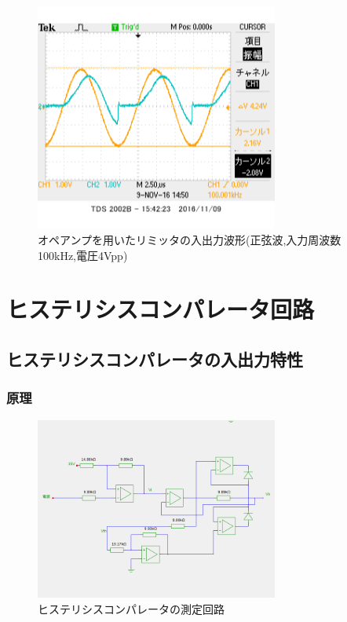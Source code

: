 \documentclass[11pt,a4j]{jsarticle}
\begin{document}
 \begin{figure}[htbp]
  \centering
  \includegraphics[width=8cm,clip]{1_1_ampFG_f100V4_ViVo.png}
  \caption{オペアンプを用いたリミッタの入出力波形(正弦波,入力周波数100kHz,電圧4Vpp)}
  \label{fig:ampFGf100v4}
 \end{figure}%
  
  
    
  
 \section{ヒステリシスコンパレータ回路}
  \subsection{ヒステリシスコンパレータの入出力特性}
   \subsubsection{原理}
    
    \begin{figure}[htbp]
  \centering
  \includegraphics[width=8cm,clip]{histeri_tokusei.png}
  \caption{ヒステリシスコンパレータの測定回路}
  \label{fig:histeri_tokusei}
 \end{figure}%
    
\end{document}
